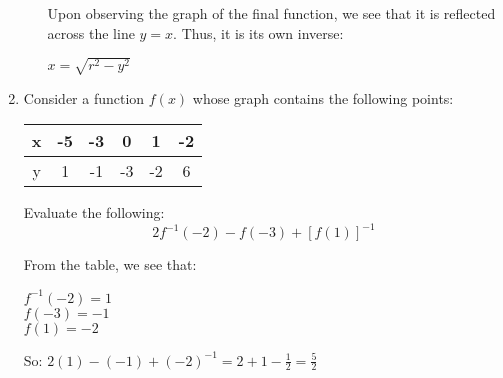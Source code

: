 \documentclass[letterpaper,12pt,fleqn]{article}
\begin{document}
\begin{enumerate}
\begin{enumerate}
    Upon observing the graph of the final function, we see that it is
    reflected across the line $y=x$. Thus, it is its own inverse:

    $x=\sqrt{r^2-y^2}$
  \end{enumerate}

\item Consider a function $f(x)$ whose graph contains the following points:

  \begin{tabular}{|c|c|c|c|c|c|}
    \hline
    x & -5 & -3 & 0 & 1 & -2 \\
    \hline
    y & 1 & -1 & -3 & -2 & 6 \\
    \hline
  \end{tabular}

  Evaluate the following:
  \[2f^{-1}(-2)-f(-3)+[f(1)]^{-1}\]

  From the table, we see that:

  $f^{-1}(-2)=1$ \\
  $f(-3)=-1$ \\
  $f(1)=-2$

  So: $2(1)-(-1)+(-2)^{-1}=2+1-\frac{1}{2}=\frac{5}{2}$
\end{enumerate}
\end{document}
